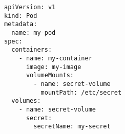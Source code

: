\begin{verbatim}
apiVersion: v1
kind: Pod
metadata:
  name: my-pod
spec:
  containers:
    - name: my-container
      image: my-image
      volumeMounts:
        - name: secret-volume
          mountPath: /etc/secret
  volumes:
    - name: secret-volume
      secret:
        secretName: my-secret
\end{verbatim}